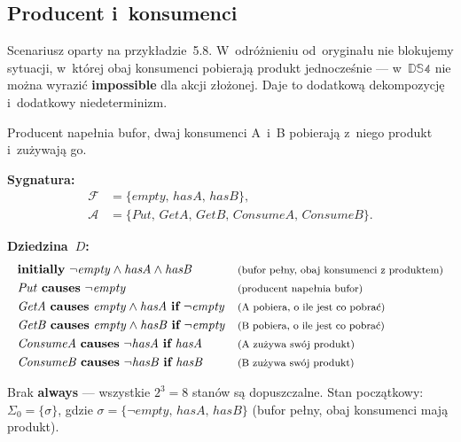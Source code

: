 \documentclass[11pt,a4paper]{article}
\newif\ifshowbib
\newcommand{\bibonly}[1]{\ifshowbib#1\fi}
\renewcommand{\cite}[2][]{\unskip}%
\newcommand{\causes}{\textbf{causes}}
\renewcommand{\iff}{\textbf{if}}
\newcommand{\initially}{\textbf{initially}}
\newcommand{\always}{\textbf{always}}
\newcommand{\impossible}{\textbf{impossible}}
\newcommand{\cmt}[1]{\text{\footnotesize\normalfont (#1)}}
\theoremstyle{definition}
\begin{document}
\subsection{Producent i~konsumenci}
\label{sec:ex-producent}

\noindent Scenariusz oparty na przykładzie~5.8\bibonly{ z~\cite{rw05}}.
W~odróżnieniu od~oryginału nie blokujemy sytuacji, w~której obaj
konsumenci pobierają produkt jednocześnie --- w~$\mathbb{DS4}$
nie można wyrazić \impossible{} dla akcji złożonej.
Daje to dodatkową dekompozycję i~dodatkowy niedeterminizm.

Producent napełnia bufor, dwaj konsumenci A~i~B pobierają z~niego
produkt i~zużywają go.

\medskip
\noindent\textbf{Sygnatura:}
\begin{align*}
  \mathcal{F} &= \{\mathit{empty},\, \mathit{hasA},\, \mathit{hasB}\}, \\
  \mathcal{A} &= \{\mathit{Put},\, \mathit{GetA},\, \mathit{GetB},\,
                   \mathit{ConsumeA},\, \mathit{ConsumeB}\}.
\end{align*}

\medskip
\noindent\textbf{Dziedzina~$D$:}
{\small
\begin{align*}
  &\initially\ \neg\mathit{empty} \land \mathit{hasA} \land \mathit{hasB}
    && \cmt{bufor pełny, obaj konsumenci z~produktem} \\
  &\mathit{Put}\ \causes\ \neg\mathit{empty}
    && \cmt{producent napełnia bufor} \\
  &\mathit{GetA}\ \causes\ \mathit{empty} \land \mathit{hasA}\ \iff\ \neg\mathit{empty}
    && \cmt{A~pobiera, o~ile jest co pobrać} \\
  &\mathit{GetB}\ \causes\ \mathit{empty} \land \mathit{hasB}\ \iff\ \neg\mathit{empty}
    && \cmt{B~pobiera, o~ile jest co pobrać} \\
  &\mathit{ConsumeA}\ \causes\ \neg\mathit{hasA}\ \iff\ \mathit{hasA}
    && \cmt{A~zużywa swój produkt} \\
  &\mathit{ConsumeB}\ \causes\ \neg\mathit{hasB}\ \iff\ \mathit{hasB}
    && \cmt{B~zużywa swój produkt}
\end{align*}
}

Brak \always{} --- wszystkie $2^3 = 8$ stanów są dopuszczalne.
Stan początkowy: $\Sigma_0 = \{\sigma\}$, gdzie
$\sigma = \{\neg\mathit{empty},\, \mathit{hasA},\, \mathit{hasB}\}$
(bufor pełny, obaj konsumenci mają produkt).
\end{document}
